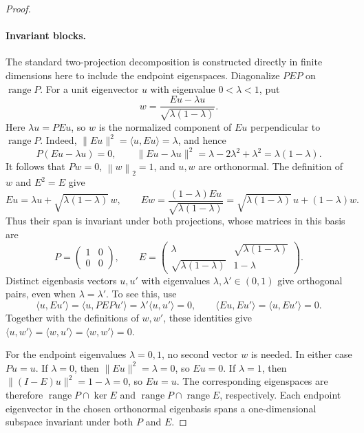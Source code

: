 \documentclass[11pt]{article}
\theoremstyle{definition}
\theoremstyle{remark}
\theoremstyle{plain}
\newcommand{\norm}[1]{\left\lVert#1\right\rVert_2}
\begin{document}
\begin{proof}
\paragraph{Invariant blocks.}
The standard two-projection decomposition
\cite[Theorem~2]{halmos1969} is constructed directly in finite
dimensions here to include the endpoint eigenspaces.
Diagonalize \(PEP\) on \(\operatorname{range}P\).
For a unit eigenvector \(u\) with eigenvalue \(0<\lambda<1\), put
\[
 w=\frac{Eu-\lambda u}{\sqrt{\lambda(1-\lambda)}}.
\]
Here \(\lambda u=PEu\), so \(w\) is the normalized component of
\(Eu\) perpendicular to \(\operatorname{range}P\).
Indeed, \(\|Eu\|^2=\langle u,Eu\rangle=\lambda\), and hence
\[
 P(Eu-\lambda u)=0,\qquad
 \|Eu-\lambda u\|^2=\lambda-2\lambda^2+\lambda^2
                         =\lambda(1-\lambda).
\]
It follows that \(Pw=0\), \(\norm w=1\), and \(u,w\) are orthonormal.
The definition of \(w\) and \(E^2=E\) give
\[
 Eu=\lambda u+\sqrt{\lambda(1-\lambda)}\,w,\qquad
 Ew=\frac{(1-\lambda)Eu}{\sqrt{\lambda(1-\lambda)}}
    =\sqrt{\lambda(1-\lambda)}\,u+(1-\lambda)w.
\]
Thus their span is invariant under both projections, whose matrices
in this basis are
\begin{equation}\label{eq:two-projection-block}
 P=\begin{pmatrix}1&0\\0&0\end{pmatrix},\qquad
 E=\begin{pmatrix}\lambda&\sqrt{\lambda(1-\lambda)}\\
                  \sqrt{\lambda(1-\lambda)}&1-\lambda\end{pmatrix}.
\end{equation}
Distinct eigenbasis vectors \(u,u'\) with eigenvalues
\(\lambda,\lambda'\in(0,1)\) give orthogonal pairs, even when
\(\lambda=\lambda'\). To see this, use
\[
 \langle u,Eu'\rangle
   =\langle u,PEPu'\rangle
   =\lambda'\langle u,u'\rangle=0,\qquad
 \langle Eu,Eu'\rangle=\langle u,Eu'\rangle=0.
\]
Together with the definitions of \(w,w'\), these identities give
\(\langle u,w'\rangle=\langle w,u'\rangle=\langle w,w'\rangle=0\).

For the endpoint eigenvalues \(\lambda=0,1\), no second vector \(w\)
is needed. In either case \(Pu=u\). If \(\lambda=0\), then
\(\|Eu\|^2=\lambda=0\), so \(Eu=0\). If \(\lambda=1\), then
\(\|(I-E)u\|^2=1-\lambda=0\), so \(Eu=u\).
The corresponding eigenspaces are therefore
\(\operatorname{range}P\cap\ker E\) and
\(\operatorname{range}P\cap\operatorname{range}E\), respectively.
Each endpoint eigenvector in the chosen orthonormal eigenbasis spans a
one-dimensional subspace invariant under both \(P\) and \(E\).


\end{proof}
\end{document}
